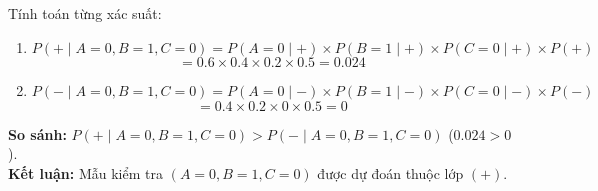 Tính toán từng xác suất:
\begin{enumerate}
    \item $P(+ \mid A=0, B=1, C=0) = P(A=0 \mid +) \times P(B=1 \mid +) \times P(C=0 \mid +) \times P(+)$
    $$= 0.6 \times 0.4 \times 0.2 \times 0.5 = 0.024$$
    \item $P(- \mid A=0, B=1, C=0) = P(A=0 \mid -) \times P(B=1 \mid -) \times P(C=0 \mid -) \times P(-)$
    $$= 0.4 \times 0.2 \times 0 \times 0.5 = 0$$
\end{enumerate}

\textbf{So sánh:} $P(+ \mid A=0, B=1, C=0) > P(- \mid A=0, B=1, C=0)$ ($0.024 > 0$). \\
\textbf{Kết luận:} Mẫu kiểm tra $(A = 0, B = 1, C = 0)$ được dự đoán thuộc lớp \textbf{$(+)$}.